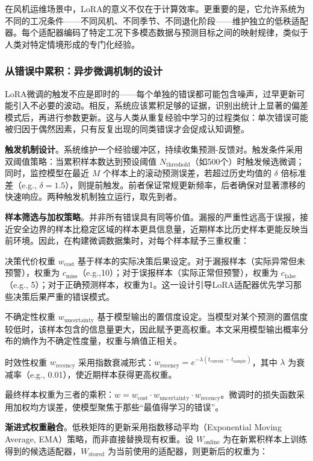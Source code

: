 \documentclass[12pt,a4paper]{article}
\begin{document}
在风机运维场景中，LoRA的意义不仅在于计算效率。更重要的是，它允许系统为不同的工况条件——不同风机、不同季节、不同退化阶段——维护独立的低秩适配器。每个适配器编码了特定工况下多模态数据与预测目标之间的映射规律，类似于人类对特定情境形成的专门化经验。

\subsubsection{从错误中累积：异步微调机制的设计}

LoRA微调的触发不应是即时的——每个单独的错误都可能包含噪声，过早更新可能引入不必要的波动。相反，系统应该累积足够的证据，识别出统计上显著的偏差模式后，再进行参数更新。这与人类从重复经验中学习的过程类似：单次错误可能被归因于偶然因素，只有反复出现的同类错误才会促成认知调整。

\textbf{触发机制设计}。系统维护一个经验缓冲区，持续收集预测-反馈对。触发条件采用双阈值策略：当累积样本数达到预设阈值 $N_{\text{threshold}}$（如500个）时触发候选微调；同时，监控模型在最近 $M$ 个样本上的滚动预测误差，若超过历史均值的 $\delta$ 倍标准差（e.g., $\delta=1.5$），则提前触发。前者保证常规更新频率，后者确保对显著漂移的快速响应。两种触发机制独立运行，取先到者。

\textbf{样本筛选与加权策略}。并非所有错误具有同等价值。漏报的严重性远高于误报，接近安全边界的样本比稳定区域的样本更具信息量，近期样本比历史样本更能反映当前环境。因此，在构建微调数据集时，对每个样本赋予三重权重：

决策代价权重 $w_{\text{cost}}$ 基于样本的实际决策后果设定。对于漏报样本（实际异常但未预警），权重为 $c_{\text{miss}}$（e.g.,10）；对于误报样本（实际正常但预警），权重为 $c_{\text{false}}$（e.g., 5）；对于正确预测样本，权重为1。这一设计引导LoRA适配器优先学习那些决策后果严重的错误模式。

不确定性权重 $w_{\text{uncertainty}}$ 基于模型输出的置信度设定。当模型对某个预测的置信度较低时，该样本包含的信息量更大，因此赋予更高权重。本文采用模型输出概率分布的熵作为不确定性度量，权重与熵值正相关。

时效性权重 $w_{\text{recency}}$ 采用指数衰减形式：$w_{\text{recency}} = e^{-\lambda (t_{\text{current}} - t_{\text{sample}})}$，其中 $\lambda$ 为衰减率（e.g., 0.01），使近期样本获得更高权重。

最终样本权重为三者的乘积：$w = w_{\text{cost}} \cdot w_{\text{uncertainty}} \cdot w_{\text{recency}}$。微调时的损失函数采用加权均方误差，使模型聚焦于那些“最值得学习的错误”。

\textbf{渐进式权重融合}。低秩矩阵的更新采用指数移动平均（Exponential Moving Average, EMA）策略，而非直接替换现有权重。设 $W_{\text{online}}$ 为在新累积样本上训练得到的候选适配器，$W_{\text{stored}}$ 为当前使用的适配器，则更新后的权重为：
\end{document}
